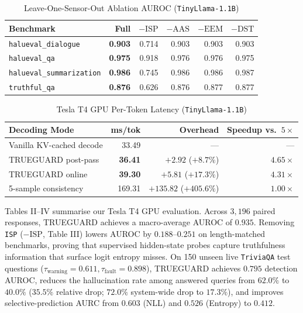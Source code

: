 \documentclass[journal]{IEEEtran}
\begin{document}
\begin{table}[t]
\centering
\caption{Leave-One-Sensor-Out Ablation AUROC (\texttt{TinyLlama-1.1B})}
\begin{tabular}{lrrrrr}
\toprule
Benchmark & Full & $-\text{ISP}$ & $-\text{AAS}$ & $-\text{EEM}$ & $-\text{DST}$ \\
\midrule
\texttt{halueval\_dialogue} & \textbf{0.903} & 0.714 & 0.903 & 0.903 & 0.903 \\
\texttt{halueval\_qa} & \textbf{0.975} & 0.918 & 0.976 & 0.976 & 0.975 \\
\texttt{halueval\_summarization} & \textbf{0.986} & 0.745 & 0.986 & 0.986 & 0.987 \\
\texttt{truthful\_qa} & \textbf{0.876} & 0.626 & 0.876 & 0.877 & 0.877 \\
\bottomrule
\end{tabular}
\end{table}

\begin{table}[t]
\centering
\caption{Tesla T4 GPU Per-Token Latency (\texttt{TinyLlama-1.1B})}
\begin{tabular}{lrrr}
\toprule
Decoding Mode & ms/tok & Overhead & Speedup vs.\ $5\times$ \\
\midrule
Vanilla KV-cached decode & 33.49 & --- & --- \\
TRUEGUARD post-pass & \textbf{36.41} & $+2.92$ ($+8.7\%$) & $\mathbf{4.65\times}$ \\
TRUEGUARD online & \textbf{39.30} & $+5.81$ ($+17.3\%$) & $\mathbf{4.31\times}$ \\
5-sample consistency & 169.31 & $+135.82$ ($+405.6\%$) & $1.00\times$ \\
\bottomrule
\end{tabular}
\end{table}

Tables II--IV summarise our Tesla T4 GPU evaluation. Across $3{,}196$ paired responses, TRUEGUARD achieves a macro-average AUROC of $0.935$. Removing \texttt{ISP} ($-\text{ISP}$, Table III) lowers AUROC by $0.188\text{--}0.251$ on length-matched benchmarks, proving that supervised hidden-state probes capture truthfulness information that surface logit entropy misses. On 150 unseen live \texttt{TriviaQA} test questions ($\tau_{\text{warning}}=0.611, \tau_{\text{fault}}=0.898$), TRUEGUARD achieves $0.795$ detection AUROC, reduces the hallucination rate among answered queries from $62.0\%$ to $40.0\%$ ($35.5\%$ relative drop; $72.0\%$ system-wide drop to $17.3\%$), and improves selective-prediction AURC from $0.603$ (NLL) and $0.526$ (Entropy) to $\mathbf{0.412}$.
\end{document}
